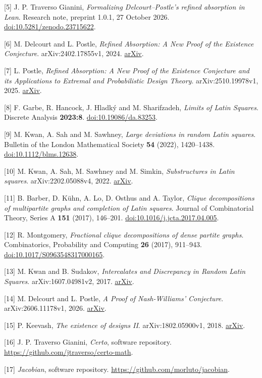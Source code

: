 \documentclass[english,11pt,a4paper]{article}
\begin{document}
{[}5{]} J. P. Traverso Gianini, \emph{Formalizing Delcourt--Postle's refined absorption in Lean}. Research note, preprint 1.0.1, 27 October 2026. \href{https://doi.org/10.5281/zenodo.23715622}{doi:10.5281/zenodo.23715622}.

{[}6{]} M. Delcourt and L. Postle, \emph{Refined Absorption: A New Proof of the Existence Conjecture}. arXiv:2402.17855v1, 2024. \href{https://arxiv.org/abs/2402.17855v1}{arXiv}.

{[}7{]} L. Postle, \emph{Refined Absorption: A New Proof of the Existence Conjecture and its Applications to Extremal and Probabilistic Design Theory}. arXiv:2510.19978v1, 2025. \href{https://arxiv.org/abs/2510.19978v1}{arXiv}.

{[}8{]} F. Garbe, R. Hancock, J. Hladký and M. Sharifzadeh, \emph{Limits of Latin Squares}. Discrete Analysis \textbf{2023:8}. \href{https://doi.org/10.19086/da.83253}{doi:10.19086/da.83253}.

{[}9{]} M. Kwan, A. Sah and M. Sawhney, \emph{Large deviations in random Latin squares}. Bulletin of the London Mathematical Society \textbf{54} (2022), 1420--1438. \href{https://doi.org/10.1112/blms.12638}{doi:10.1112/blms.12638}.

{[}10{]} M. Kwan, A. Sah, M. Sawhney and M. Simkin, \emph{Substructures in Latin squares}. arXiv:2202.05088v4, 2022. \href{https://arxiv.org/abs/2202.05088v4}{arXiv}.

{[}11{]} B. Barber, D. Kühn, A. Lo, D. Osthus and A. Taylor, \emph{Clique decompositions of multipartite graphs and completion of Latin squares}. Journal of Combinatorial Theory, Series A \textbf{151} (2017), 146--201. \href{https://doi.org/10.1016/j.jcta.2017.04.005}{doi:10.1016/j.jcta.2017.04.005}.

{[}12{]} R. Montgomery, \emph{Fractional clique decompositions of dense partite graphs}. Combinatorics, Probability and Computing \textbf{26} (2017), 911--943. \href{https://doi.org/10.1017/S0963548317000165}{doi:10.1017/S0963548317000165}.

{[}13{]} M. Kwan and B. Sudakov, \emph{Intercalates and Discrepancy in Random Latin Squares}. arXiv:1607.04981v2, 2017. \href{https://arxiv.org/abs/1607.04981v2}{arXiv}.

{[}14{]} M. Delcourt and L. Postle, \emph{A Proof of Nash-Williams' Conjecture}. arXiv:2606.11178v1, 2026. \href{https://arxiv.org/abs/2606.11178v1}{arXiv}.

{[}15{]} P. Keevash, \emph{The existence of designs II}. arXiv:1802.05900v1, 2018. \href{https://arxiv.org/abs/1802.05900v1}{arXiv}.

{[}16{]} J. P. Traverso Gianini, \emph{Certo}, software repository. \url{https://github.com/jtraverso/certo-math}.

{[}17{]} \emph{Jacobian}, software repository. \url{https://github.com/morluto/jacobian}.

\endgroup
\end{document}
